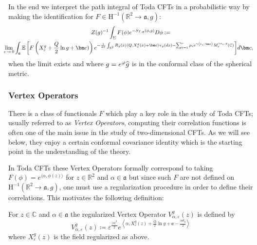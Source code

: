 \documentclass[AHL,Unicode,longabstracts,published]{cedram}
\newcommand{\frkg}{\mathfrak{g}}
\newcommand{\frka}{\mathfrak{a}}
\newcommand{\rmv}{\mathrm{v}}
\newcommand{\rmH}{\mathrm{H}}
\newcommand{\C}{\mathbb{C}}
\newcommand{\R}{\mathbb{R}}
\newcommand{\E}{\mathbb{E}}
\newcommand{\ps}[1]{\langle #1 \rangle}
\newcommand*\eps{\varepsilon}
\newcommand*\green[1]{#1}
\let\oldhat\hat
\renewcommand*{\hat}[1]{\mathchoice{\widehat{#1}}{\widehat{#1}}{\oldhat{#1}}{\oldhat{#1}}}
\begin{document}
In the end we interpret the path integral of Toda CFTs in a probabilistic way by making the identification for $F \in \rmH^{-1}(\R^2\to\frka,g)$:
\begin{multline}\label{def:TPI}
Z(g)^{-1} \int_\Sigma F(\phi)e^{-S_{T,\frkg}(\phi,g) }D\phi:=\\
\mkern-15mu\lim\limits_{\eps\,\rightarrow\,0}\int_{\frka}\E\left[F\left(X^g_\eps+\frac Q2\ln g+\bm c)\right)e^{-\frac{1}{4 \pi} \int_{\R^2} R_g(x) \left\langle Q, X^g_\eps(x)+\bm c \right\rangle \rmv_ g(dx) -\sum_{i=1}^{r} \mu_i e^{\gamma \left\langle e_i, \bm c\right\rangle}M^{ \gamma e_i,g}_\eps(\C) }\right]\!d\bm c,
\end{multline}
when the limit exists and where $g=e^{\varphi}\hat g$ is in the conformal class of the spherical metric.

\subsubsection{Vertex Operators}\label{vertex}
There is a class of functionals $F$ which play a key role in the study of Toda CFTs; usually referred to as \emph{Vertex Operators}, computing their correlation functions is often one of the main issue in the study of two-dimensional CFTs. As we will see below, they enjoy a certain conformal covariance identity which is the starting point in the understanding of the theory.

In Toda CFTs these Vertex Operators formally correspond to taking $F(\phi)=e^{\ps{\alpha,\green\phi(z)}}$ for $z\in\R^2$ and $\alpha\in\frka$ but since such $F$ are not defined on $\rmH^{-1}(\R^2\to\frka,g)$, one must use a regularization procedure in order to define their correlations. This motivates the following definition:
\begin{defi}
For $z\in \C$ and $\alpha\in \frka$ the regularized Vertex Operator $V^g_{\alpha,\eps}(z)$ is defined by
\begin{equation}
V^g_{\alpha,\eps}(z)\coloneqq \eps^{\frac{|\alpha|^2}{2}} e^{\left\langle\alpha, X^g_\eps(z) + \frac Q2\ln g+\bm c-\frac{\alpha\theta_{\eta}}2\right\rangle}
\end{equation}
where $X^g_\eps(z)$ is the field regularized as above.
\end{defi}
\end{document}
